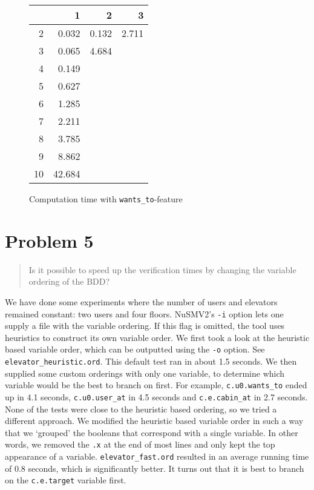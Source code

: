 \documentclass[a4paper,10pt]{article}
\begin{document}
	\begin{figure}[H]
		\begin{center}
			\begin{tabular}{r|r|r|r}
				\backslashbox{$F$}{$n$} & 1 & 2 & 3 \\ \hline
				2	& 0.032		& 0.132		& 2.711		\\ \hline
				3	& 0.065		& 4.684		&			\\ \hline
				4	& 0.149		&			&			\\ \hline
				5	& 0.627		&			&			\\ \hline
				6	& 1.285		&			&			\\ \hline 
				7	& 2.211		&			&			\\ \hline
				8	& 3.785		&			&			\\ \hline
				9	& 8.862		&			&			\\ \hline
				10	& 42.684	&			&			\\ \hline
			\end{tabular}
		\end{center}
		
		\caption{Computation time with \texttt{wants\_to}-feature}
	\end{figure}
	
	\section{Problem 5}
	
	\begin{quote}
		Is it possible to speed up the verification times by changing the variable ordering of the BDD?
	\end{quote}
	
	We have done some experiments where the number of users and elevators remained constant: two users and four floors. NuSMV2's \texttt{-i} option lets one supply a file with the variable ordering. If this flag is omitted, the tool uses heuristics to construct its own variable order. We first took a look at the heuristic based variable order, which can be outputted using the \texttt{-o} option. See \texttt{elevator\_heuristic.ord}. This default test ran in about 1.5 seconds. We then supplied some custom orderings with only one variable, to determine which variable would be the best to branch on first. For example, \texttt{c.u0.wants\_to} ended up in 4.1 seconds, \texttt{c.u0.user\_at} in 4.5 seconds and \texttt{c.e.cabin\_at} in 2.7 seconds. None of the tests were close to the heuristic based ordering, so we tried a different approach. We modified the heuristic based variable order in such a way that we `grouped' the booleans that correspond with a single variable. In other words, we removed the \texttt{.x} at the end of most lines and only kept the top appearance of a variable. \texttt{elevator\_fast.ord} resulted in an average running time of 0.8 seconds, which is significantly better. It turns out that it is best to branch on the \texttt{c.e.target} variable first.
	
\end{document}
